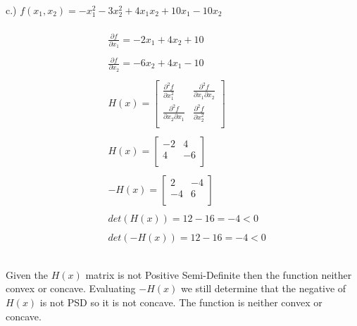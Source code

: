 \documentclass[12pt]{article}
\begin{document}
c.) $f(x_1,x_2) = -x_1^2 -3x_2^2 + 4x_1x_2 + 10x_1 - 10x_2$\\\\
\begin{align*}
    &\frac{\partial f}{\partial x_1} = -2x_1 + 4x_2 + 10\\ \\
    &\frac{\partial f}{\partial x_2} = -6x_2 + 4x_1 - 10 \\ \\  
        &H(x) = 
        \begin{bmatrix}
          \frac{\partial^2 f}{\partial x_1^2} & \frac{\partial^2 f}{\partial x_1 \partial x_2} \\
          \frac{\partial^2 f}{\partial x_2 \partial x_1} & \frac{\partial^2 f}{\partial x_2^2} \\
        \end{bmatrix} \\ \\
    &H(x) =
        \begin{bmatrix}
            -2 & 4 \\
            4 & -6 \\
        \end{bmatrix}\\ \\
    &-H(x) =
        \begin{bmatrix}
            2 & -4 \\
            -4 & 6 \\
        \end{bmatrix}\\ \\
    &det(H(x)) = 12-16 = -4 < 0\\ \\
    &det(-H(x)) = 12 -16 = -4 < 0 \\ \\
\end{align*}\\

Given the $H(x)$ matrix is not Positive Semi-Definite then the function neither convex or concave. Evaluating $-H(x)$ we still determine that the negative of $H(x)$ is not PSD so it is not concave. The function is neither convex or concave.\\
\end{document}
